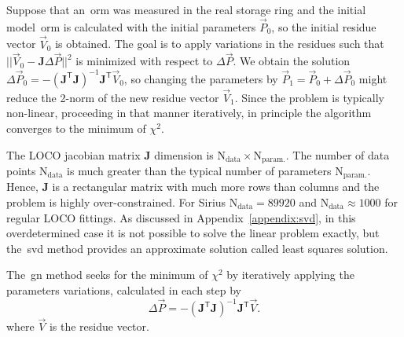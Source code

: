 Suppose that an~\gls{orm} was measured in the real storage ring and the initial model~\gls{orm} is calculated with the initial parameters $\vec{P}_0$, so the initial residue vector $\vec{V}_0$ is obtained. The goal is to apply variations in the residues such that $||\vec{V}_0 - \mathbf{J}\Delta\vec{P}||^2 $ is minimized with respect to $\Delta\vec{P}$. We obtain the solution $\Delta \vec{P}_0 = -\left(\mathbf{J}^{\mathsf{T}}\mathbf{J}\right)^{-1}\mathbf{J}^{\mathsf{T}}\vec{V}_0$, so changing the parameters by $\vec{P}_1 = \vec{P}_0 + \Delta \vec{P}_0$ might reduce the 2-norm of the new residue vector $\vec{V}_1$. Since the problem is typically non-linear, proceeding in that manner iteratively, in principle the algorithm converges to the minimum of $\chi^2$.

The LOCO jacobian matrix $\mathbf{J}$ dimension is $\mathrm{N}_{\mathrm{data}} \times \mathrm{N}_{\mathrm{param.}}$. The number of data points $\mathrm{N}_{\mathrm{data}}$ is much greater than the typical number of parameters $\mathrm{N}_{\mathrm{param.}}$. Hence, $\mathbf{J}$ is a rectangular matrix with much more rows than columns and the problem is highly over-constrained. For Sirius $\mathrm{N}_{\mathrm{data}} = 89920$ and $\mathrm{N}_{\mathrm{data}} \approx 1000$ for regular LOCO fittings. As discussed in Appendix~\ref{appendix:svd}, in this overdetermined case it is not possible to solve the linear problem exactly, but the~\gls{svd} method provides an approximate solution called least squares solution.

The~\gls{gn} method seeks for the minimum of $\chi^2$ by iteratively applying the parameters variations, calculated in each step by
\begin{equation}
    \Delta \vec{P} = - \left(\mathbf{J}^{\mathsf{T}} \mathbf{J}\right)^{-1}\mathbf{J}^{\mathsf{T}} \vec{V}.
\end{equation}
where $\vec{V}$ is the residue vector.


